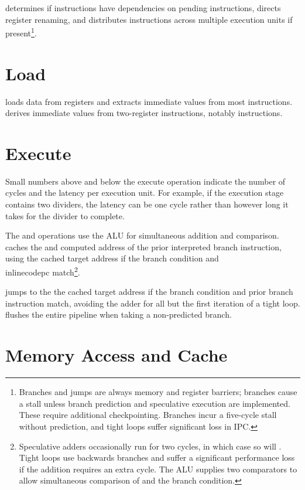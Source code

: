  determines if instructions have dependencies on pending
instructions, directs register renaming, and distributes instructions across
multiple execution units if present\footnote{Branches and jumps are always
memory and register barriers; branches cause a stall unless branch prediction
and speculative execution are implemented.  These require additional
checkpointing.  Branches incur a five-cycle stall without prediction, and tight
loops suffer significant loss in IPC.}.

\section{Load}

 loads data from registers and extracts immediate values from
most instructions.   derives immediate values from
two-register instructions, notably  instructions.

\section{Execute}

Small numbers above and below the execute operation indicate the number of
cycles and the latency per execution unit.  For example, if the execution stage
contains two dividers, the latency can be one cycle rather than however long it
takes for the divider to complete.

The  and  operations use the ALU for
simultaneous addition and comparison.   caches the
 and computed address of the prior interpreted branch
instruction, using the cached target address if the branch condition and
\\inlinecode{pc} match\footnote{Speculative adders occasionally run for two
cycles, in which case so will .  Tight loops use
backwards branches and suffer a significant performance loss if the addition
requires an extra cycle.  The ALU supplies two comparators to allow
simultaneous comparison of  and the branch condition.}.

 jumps to the the cached target address if the branch
condition and prior branch instruction match, avoiding the adder for all but
the first iteration of a tight loop.   flushes the entire
pipeline when taking a non-predicted branch.

\section{Memory Access and Cache}

